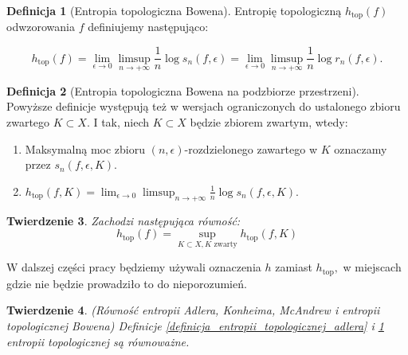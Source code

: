 \documentclass[licencjacka]{pwr_wmat_praca_dyplomowa}
\theoremstyle{plain}
\newtheorem{theorem}{Twierdzenie}
\numberwithin{theorem}{chapter}
\theoremstyle{definition}
\numberwithin{theorem}{chapter}
\newtheorem{definition}[theorem]{Definicja}
\begin{document}
\begin{definition}[Entropia topologiczna Bowena]
\label{definicja_entropii_topologicznej_bowena}
\cite[s.~59]{ruette2017chaos}
Entropię topologiczną $h_{\textrm{top}}(f)$ odwzorowania $f$ definiujemy następująco:

$$h_{\textrm{top}}(f) = \lim_{\epsilon \rightarrow 0} \limsup_{n \rightarrow +\infty} \frac{1}{n} \log s_n(f, \epsilon) = \lim_{\epsilon \rightarrow 0} \limsup_{n \rightarrow +\infty} \frac{1}{n} \log r_n(f, \epsilon).$$

\end{definition}


\begin{definition}[Entropia topologiczna Bowena na podzbiorze przestrzeni]
\label{entropia_bowena_podzbior_przestrzeni}
\cite[s.~402]{bowen1971entropy__do_dowodu_rownosci_topologicznej_entropii_2_twierdzenie17}
Powyższe definicje występują też w wersjach ograniczonych do ustalonego zbioru zwartego $K \subset X.$ I tak, niech $K \subset X$ będzie zbiorem zwartym, wtedy:
\begin{enumerate}
\item Maksymalną moc zbioru $(n, \epsilon)$-rozdzielonego zawartego w $K$ oznaczamy przez $s_n(f, \epsilon, K).$
\item $h_{\textrm{top}}(f, K) = \lim_{\epsilon \rightarrow 0} \limsup_{n \rightarrow +\infty} \frac{1}{n} \log s_n(f, \epsilon, K).$
\end{enumerate}

\end{definition}


\begin{theorem}
\cite[s.~402]{bowen1971entropy__do_dowodu_rownosci_topologicznej_entropii_2_twierdzenie17}
Zachodzi następująca równość:
$$h_{\textrm{top}}(f) = \sup_{K \subset X, K \textrm{ zwarty}}h_{\textrm{top}}(f, K)$$
\end{theorem}

W dalszej części pracy będziemy używali oznaczenia $h$ zamiast $h_{\textrm{top}},$ w miejscach gdzie nie będzie prowadziło to do nieporozumień.



\begin{theorem}(Równość entropii Adlera, Konheima, McAndrew i entropii topologicznej Bowena)
Definicje \ref{definicja_entropii_topologicznej_adlera} i \ref{definicja_entropii_topologicznej_bowena} entropii topologicznej są równoważne. \cite[s.~59]{ruette2017chaos}
\end{theorem}
\end{document}
